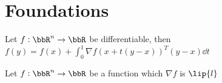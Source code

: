 \section{Foundations}

\begin{theorem}
    Let $f: \bbR^n \to \bbR $ be differentiable,
    then $f(y) = f(x) + \int_{0}^{1} \nabla f\left(x + t(y-x)\right)^T(y-x) \dd{t}$
    
\end{theorem}

\begin{lemma}
    Let $f: \bbR^n \to \bbR $ be a function which $\nabla f$ is $\lip{l}$
\end{lemma}